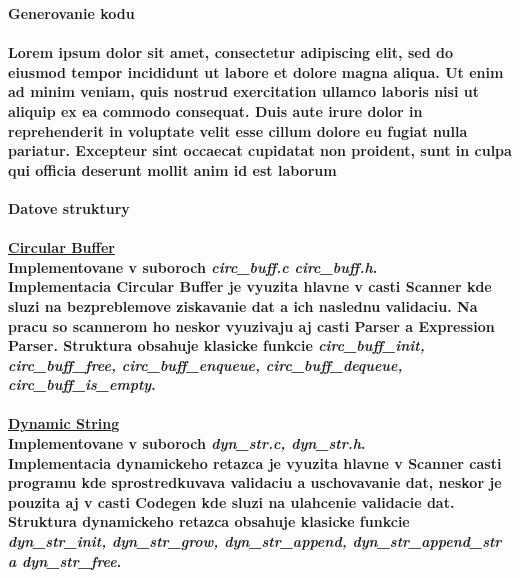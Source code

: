 \documentclass[12pt]{article}
\begin{document}
 \Large \textbf{Generovanie kodu} \normalsize \\
\noindent\makebox[\linewidth]{\rule{\textwidth}{0.4pt}}

\paragraph{Lorem ipsum dolor sit amet, consectetur adipiscing elit, sed do eiusmod tempor incididunt ut labore et dolore magna aliqua. Ut enim ad minim veniam, quis nostrud exercitation ullamco laboris nisi ut aliquip ex ea commodo consequat. Duis aute irure dolor in reprehenderit in voluptate velit esse cillum dolore eu fugiat nulla pariatur. Excepteur sint occaecat cupidatat non proident, sunt in culpa qui officia deserunt mollit anim id est laborum \newline \\}

 \Large \textbf{Datove struktury}\normalsize \\
\noindent\makebox[\linewidth]{\rule{\textwidth}{0.4pt}}

\paragraph{\large \underline{Circular Buffer} \\ Implementovane v suboroch \textit{circ\_buff.c circ\_buff.h}. \\ \newline
Implementacia Circular Buffer je vyuzita hlavne v casti Scanner kde sluzi na bezpreblemove ziskavanie dat a ich naslednu validaciu. Na pracu so scannerom ho neskor vyuzivaju aj casti Parser a Expression Parser. Struktura obsahuje klasicke funkcie \textit{circ\_buff\_init, circ\_buff\_free, circ\_buff\_enqueue, circ\_buff\_dequeue, circ\_buff\_is\_empty}. 
\newline \\}

\paragraph{\large \underline{Dynamic String} \\ Implementovane v suboroch \textit{dyn\_str.c, dyn\_str.h}. \\ \newline
Implementacia dynamickeho retazca je vyuzita hlavne v Scanner casti programu kde sprostredkuvava validaciu a uschovavanie dat, neskor je pouzita aj v casti Codegen kde sluzi na ulahcenie validacie dat. Struktura dynamickeho retazca obsahuje klasicke funkcie \textit{dyn\_str\_init, dyn\_str\_grow, dyn\_str\_append, dyn\_str\_append\_str a dyn\_str\_free}.  
\newline \\}
\end{document}
